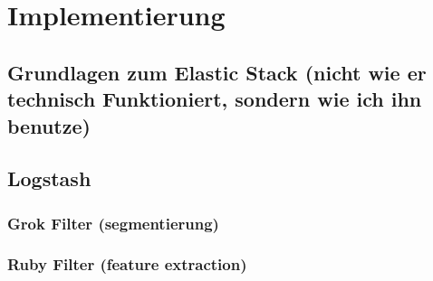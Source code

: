 \section{Implementierung}
\label{sec:Implementierung}

\subsection{Grundlagen zum Elastic Stack (nicht wie er technisch Funktioniert, sondern wie ich ihn benutze)}
\label{sub:Grundlagen zum Elastic Stack}

\subsection{Logstash}
\label{sub:Logstash}

\subsubsection{Grok Filter (segmentierung)}
\label{ssub:grok Filter}

\subsubsection{Ruby Filter (feature extraction)}
\label{ssub:JSON Filter}




